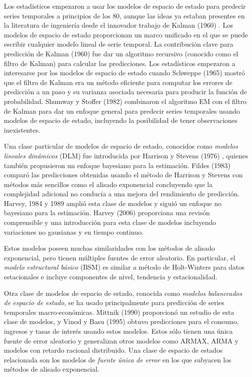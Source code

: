 \documentclass{llncs}
\begin{document}
Los estadísticos empezaron a usar los modelos de espacio de estado para predecir series temporales a principios de los 80, aunque las ideas ya estaban presentes en la literatura de ingeniería desde el innovador trabajo de Kalman (1960) \cite{Kalman196035}. Los modelos de espacio de estado proporcionan un marco unificado en el que se puede escribir cualquier modelo lineal de serie temporal. La contribución clave para predicción de Kalman (1960) fue dar un  algoritmo recursivo (conocido como el filtro de Kalman) para calcular las predicciones. Los estadísticos empezaron a interesarse por los modelos de espacio de estado cuando Schweppe (1965) \cite{Schweppe196561} mostró que el filtro de Kalman era un método eficiente para computar los errores de predicción a un paso y su varianza asociada necesaria para producir la función de probabilidad. Shumway y Stoffer (1982)\cite{Shumway1982253} combinaron el algoritmo EM con el filtro de Kalman para dar un enfoque general para predecir series temporales usando modelos de espacio de estado, incluyendo la posibilidad de tener observaciones inexistentes.

Una clase particular de modelos de espacio de estado, conocidos como \emph{modelos lineales dinámicos} (DLM) fue introducida por Harrison y Stevens (1976) \cite{Harrison1976205}, quienes también propusieron un enfoque bayesiano para la estimación. Fildes (1983) \cite{Fildes1983137} comparó las predicciones obtenidas usando el método de Harrison y Stevens con métodos más sencillos como el alisado exponencial concluyendo que la complejidad adicional no conducía a una mejora del rendimiento de predicción. Harvey, 1984 \cite{Harvey1984245} y 1989 \cite{Harvey1989} amplió esta clase de modelos y siguió un enfoque no bayesiano para la estimación.  Harvey (2006) \cite{Harvey2006327} proporciona una revisón comprensible y una introducción para esta clase de modelos incluyendo variaciones no gausianas y en tiempo continuo. 

Estos modelos poseen muchas similaridades con los métodos de alisado exponencial, pero tienen múltiples fuentes de error aleatorio. En particular, el \emph{modelo estructural básico} (BSM) es similar a método de Holt-Winters para datos estacionales e incluye componentes de nivel, tendencia y estacionalidad.

Otra clase de modelos de espacio de estado, conocida como \emph{modelos balanceados de espacio de estado}, se ha usado principalmente para predicción de series temporales macro-económicas. Mittnik (1990)\cite{Mittnik1990337} proporcionó un estudio de esta clase de modelos, y Vinod y Basu (1995) \cite{Vinod1995217} obtuvo predicciones para el consumo, ingresos y tasas de interés usando estos modelos. Estos sólo tienen una única fuente de error aleatorio y generalizan otros modelos como ARMAX, ARMA y modelos con retardo racional distribuido. Una clase de espacio de estados relacionada son los modelos de \emph{fuente única de error} en los que subyacen los métodos de alisado exponencial.
\end{document}
